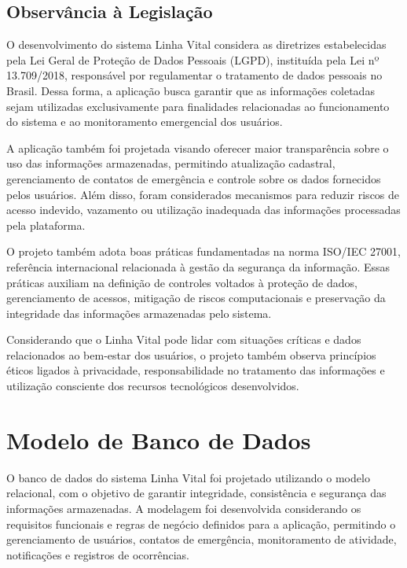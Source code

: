 \subsection{Observância à Legislação}

O desenvolvimento do sistema Linha Vital considera as diretrizes estabelecidas pela Lei Geral de Proteção de Dados Pessoais (LGPD), instituída pela Lei nº 13.709/2018, responsável por regulamentar o tratamento de dados pessoais no Brasil. Dessa forma, a aplicação busca garantir que as informações coletadas sejam utilizadas exclusivamente para finalidades relacionadas ao funcionamento do sistema e ao monitoramento emergencial dos usuários.

A aplicação também foi projetada visando oferecer maior transparência sobre o uso das informações armazenadas, permitindo atualização cadastral, gerenciamento de contatos de emergência e controle sobre os dados fornecidos pelos usuários. Além disso, foram considerados mecanismos para reduzir riscos de acesso indevido, vazamento ou utilização inadequada das informações processadas pela plataforma.

O projeto também adota boas práticas fundamentadas na norma ISO/IEC 27001, referência internacional relacionada à gestão da segurança da informação. Essas práticas auxiliam na definição de controles voltados à proteção de dados, gerenciamento de acessos, mitigação de riscos computacionais e preservação da integridade das informações armazenadas pelo sistema.

Considerando que o Linha Vital pode lidar com situações críticas e dados relacionados ao bem-estar dos usuários, o projeto também observa princípios éticos ligados à privacidade, responsabilidade no tratamento das informações e utilização consciente dos recursos tecnológicos desenvolvidos.

\section{Modelo de Banco de Dados}

O banco de dados do sistema Linha Vital foi projetado utilizando o modelo relacional, com o objetivo de garantir integridade, consistência e segurança das informações armazenadas. A modelagem foi desenvolvida considerando os requisitos funcionais e regras de negócio definidos para a aplicação, permitindo o gerenciamento de usuários, contatos de emergência, monitoramento de atividade, notificações e registros de ocorrências.

